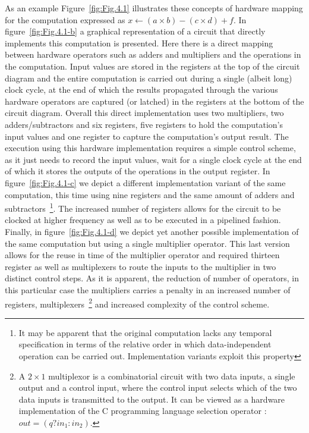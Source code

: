 As an example Figure~\ref{fig:Fig.4.1} illustrates these concepts of hardware mapping for the computation expressed as $x \gets (a \times b) - (c \times d) + f$. 
In figure~\ref{fig:Fig.4.1-b} a graphical representation of a circuit that directly implements this computation is presented. 
Here there is a direct mapping between hardware operators such as adders and multipliers and the operations in the computation. 
Input values are stored in the registers at the top of the circuit diagram and the entire computation is carried out during a single (albeit long) clock cycle, at the end of which the results propagated through the various hardware operators are captured (or latched) in the registers at the bottom of the circuit diagram. 
Overall this direct implementation uses two multipliers, two adders/subtractors and six registers, five registers to hold the computation's input values and one register to capture the computation's output result.
The execution using this hardware implementation  requires a simple control scheme, as it just needs to record the input values, wait for a single clock cycle at the end of which it stores the outputs of the operations in the output register. 
In figure~\ref{fig:Fig.4.1-c} we depict a different implementation variant of the same computation, this time using nine registers and the same amount of adders and subtractors~\footnote{It may be apparent that the original computation lacks any temporal specification in terms of the relative order in which data-independent operation can be carried out. Implementation variants exploit this property}.
The increased number of registers allows for the circuit to be clocked at higher frequency as well as to be executed in a pipelined fashion. 
Finally, in figure~\ref{fig:Fig.4.1-d} we depict yet another possible implementation of the same computation but using a single multiplier operator. 
This last version allows for the reuse in time of the multiplier operator and required thirteen register as well as multiplexers to route the inputs to the multiplier in two distinct control steps. 
As it is apparent, the reduction of number of operators, in this particular case the multipliers carries a penalty in an increased number of registers, multiplexers~\footnote{A $2\times1$ multiplexor is a combinatorial circuit with two data inputs, a single output and a control input, where the control input selects which of the two data inputs is transmitted to the output. 
  It can be viewed as a hardware implementation of the C programming language selection operator : 
  $\textit{out} = (q ? 
    \textit{in}_1 : 
    \textit{in}_2)$.} 
and increased complexity of the control scheme.\\

